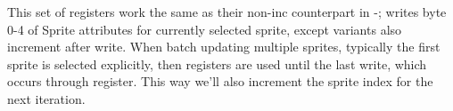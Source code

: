 \subsubsection{}
\vspace*{-2ex}
\subsubsection{}

This set of registers work the same as their non-inc counterpart in -; writes byte 0-4 of Sprite attributes for currently selected sprite, except  variants also increment  after write. When batch updating multiple sprites, typically the first sprite is selected explicitly, then  registers are used until the last write, which occurs through  register. This way we'll also increment the sprite index for the next iteration.


\pagebreak